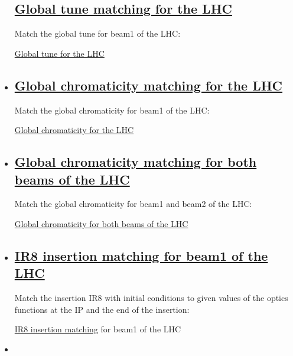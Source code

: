 \begin{itemize}
\subsection{\href{cell}{Global tune matching for the LHC}} Match the global tune for beam1 of the LHC: 

\href{http://cern.ch/madx/madX/examples/match/lhc.tune/job.lhc.tune.madx}{Global tune for the LHC}%
	\item 

\subsection{\href{cell}{Global chromaticity matching for the LHC}} Match the global chromaticity for beam1 of the LHC: 

\href{http://cern.ch/madx/madX/examples/match/lhc.chromaticity/job.lhc.chromaticity.madx}{Global chromaticity for the LHC}%
	\item 

\subsection{\href{cell}{Global chromaticity matching for both beams of the LHC}} Match the global chromaticity for beam1 and beam2 of the LHC: 

\href{http://cern.ch/madx/madX/examples/match/lhc.2chromaticity/job.lhc.2chromaticity.madx}{Global chromaticity for both beams of the LHC}%
	\item 

\subsection{\href{cell}{IR8 insertion matching for beam1 of the LHC}} Match the insertion IR8 with initial conditions to given values of the optics  functions at the IP and the end of the insertion: 

\href{http://cern.ch/madx/madX/examples/match/lhc.insertion/job.lhc.insertion.madx}{IR8 insertion matching} for beam1 of the LHC
	\item 


\end{itemize}
